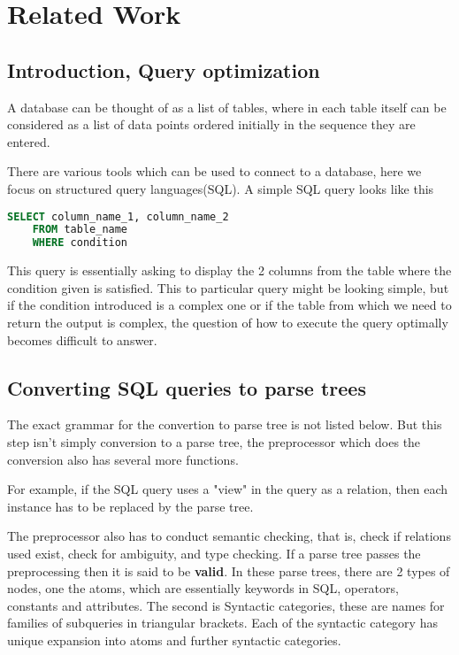 \chapter{Related Work}
\label{chapter:related_work}
\thispagestyle{myheadings}

\graphicspath{{2_Body/Figures/}}

\section{Introduction, Query optimization}
A database can be thought of as a list of tables, where in each table itself can be considered as a list of data points ordered initially in the sequence they are entered.
\par There are various tools which can be used to connect to a database, here we focus on structured query languages(SQL). A simple SQL query looks like this
\begin{lstlisting}[language=SQL]
    SELECT column_name_1, column_name_2
    FROM table_name
    WHERE condition
\end{lstlisting}
This query is essentially asking to display the 2 columns from the table where the condition given is satisfied. This to particular query might be looking simple, but if the condition introduced is a complex one or if the table from which we need to return the output is complex, the question of how to execute the query optimally becomes difficult to answer.

\section{Converting SQL queries to parse trees}
The exact grammar for the convertion to parse tree is not listed below. But this step isn't simply conversion to a parse tree, the preprocessor which does the conversion also has several more functions.
\par For example, if the SQL query uses a "view" in the query as a relation, then each instance has to be replaced by the parse tree.
\par The preprocessor also has to conduct semantic checking, that is, check if relations used exist, check for ambiguity, and type checking. If a parse tree passes the preprocessing then it is said to be \textbf{valid}.  In these parse trees, there are 2 types of nodes, one the atoms, which are essentially keywords in SQL, operators, constants and attributes. The second is Syntactic categories, these are names for families of subqueries in triangular brackets. Each of the syntactic category has unique expansion into atoms and further syntactic categories.


